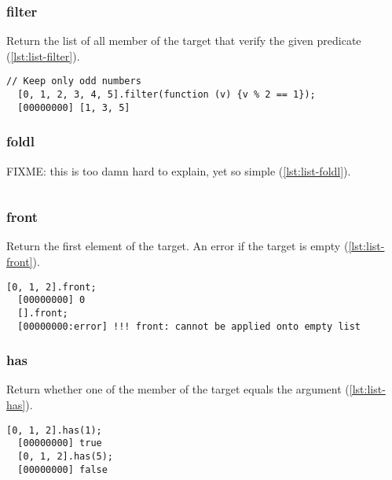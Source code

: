 \subsubsection{filter}

Return the list of all member of the target that verify the given
predicate (\autoref{lst:list-filter}).

\begin{lstlisting}[caption=List.filter, label=lst:list-filter, float=\floatposh]
  // Keep only odd numbers
  [0, 1, 2, 3, 4, 5].filter(function (v) {v % 2 == 1});
  [00000000] [1, 3, 5]
\end{lstlisting}

\subsubsection{foldl}

FIXME: this is too damn hard to explain, yet so simple
(\autoref{lst:list-foldl}).

\begin{lstlisting}[caption=List.foldl, label=lst:list-foldl, float=\floatposh]

\end{lstlisting}

\subsubsection{front}
\label{sec:std-list-front}

Return the first element of the target. An error if the target is
empty (\autoref{lst:list-front}).

\begin{lstlisting}[caption=List.front, label=lst:list-front, float=\floatposh]
  [0, 1, 2].front;
  [00000000] 0
  [].front;
  [00000000:error] !!! front: cannot be applied onto empty list
\end{lstlisting}

\subsubsection{has}

Return whether one of the member of the target equals the argument
(\autoref{lst:list-has}).

\begin{lstlisting}[caption=List.has, label=lst:list-has, float=\floatposh]
  [0, 1, 2].has(1);
  [00000000] true
  [0, 1, 2].has(5);
  [00000000] false
\end{lstlisting}

